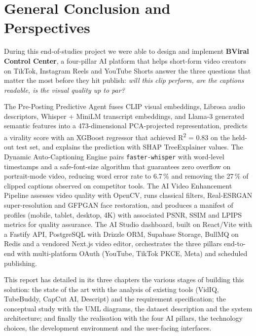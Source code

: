 \chapter*{General Conclusion and Perspectives}

During this end-of-studies project we were able to design and implement
\textbf{BViral Control Center}, a four-pillar AI platform that helps short-form video
creators on TikTok, Instagram Reels and YouTube Shorts answer the three questions that
matter the most before they hit publish: \emph{will this clip perform, are the captions
readable, is the visual quality up to par?}

The Pre-Posting Predictive Agent fuses CLIP visual embeddings, Librosa audio descriptors,
Whisper + MiniLM transcript embeddings, and Llama-3 generated semantic features into a
473-dimensional PCA-projected representation, predicts a virality score with an XGBoost
regressor that achieved R\textsuperscript{2} = 0.83 on the held-out test set, and explains
the prediction with SHAP TreeExplainer values. The Dynamic Auto-Captioning Engine pairs
\texttt{faster-whisper} with word-level timestamps and a safe-font-size algorithm that
guarantees zero overflow on portrait-mode video, reducing word error rate to 6.7\,\% and
removing the 27\,\% of clipped captions observed on competitor tools. The AI Video
Enhancement Pipeline assesses video quality with OpenCV, runs classical filters,
Real-ESRGAN super-resolution and GFPGAN face restoration, and produces a manifest of
profiles (mobile, tablet, desktop, 4K) with associated PSNR, SSIM and LPIPS metrics for
quality assurance. The AI Studio dashboard, built on React/Vite with a Fastify API,
PostgreSQL with Drizzle ORM, Supabase Storage, BullMQ on Redis and a vendored Next.js
video editor, orchestrates the three pillars end-to-end with multi-platform OAuth
(YouTube, TikTok PKCE, Meta) and scheduled publishing.

This report has detailed in its three chapters the various stages of building this
solution: the state of the art with the analysis of existing tools (VidIQ, TubeBuddy,
CapCut AI, Descript) and the requirement specification; the conceptual study with the UML
diagrams, the dataset description and the system architecture; and finally the realisation
with the four AI pillars, the technology choices, the development environment and the
user-facing interfaces.

